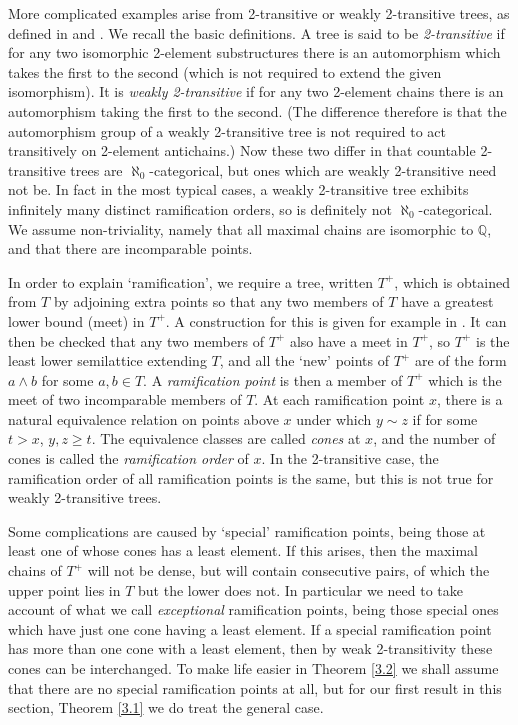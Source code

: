 \documentclass[a4paper,reqno]{amsart}
\numberwithin{equation}{section}
\begin{document}
More complicated examples arise from 2-transitive or weakly 2-transitive trees, as defined in \cite{Droste1} and 
\cite{Droste2}. We recall the basic definitions. A tree is said to be {\em 2-transitive} if for any two 
isomorphic 2-element substructures there is an automorphism which takes the first to the second (which is not
required to extend the given isomorphism). It is {\em weakly 2-transitive} if for any two 2-element chains
there is an automorphism taking the first to the second. (The difference therefore is that the automorphism
group of a weakly 2-transitive tree is not required to act transitively on 2-element antichains.) Now these 
two differ in that countable 2-transitive trees are $\aleph_0$-categorical, but ones which
are weakly 2-transitive need not be. In fact in the most typical cases, a weakly 2-transitive tree exhibits 
infinitely many distinct ramification orders, so is definitely not $\aleph_0$-categorical. We assume non-triviality, 
namely that all maximal chains are isomorphic to $\mathbb Q$, and that there are incomparable points.

In order to explain `ramification', we require a tree, written $T^+$, which is obtained from $T$ by adjoining
extra points so that any two members of $T$ have a greatest lower bound (meet) in $T^+$. A construction for 
this is given for example in \cite{Droste1}. It can then be checked that any two members of $T^+$ also have a 
meet in $T^+$, so $T^+$ is the least lower semilattice extending $T$, and all the `new' points of $T^+$ are of the 
form $a \wedge b$ for some $a, b \in T$. A {\em ramification point} is then a member of $T^+$ which is the meet of two 
incomparable members of $T$. At each ramification point $x$, there is a natural equivalence relation on points
above $x$ under which $y \sim z$ if for some $t > x$, $y, z \ge t$. The equivalence classes are called {\em cones}
at $x$, and the number of cones is called the {\em ramification order} of $x$. In the 2-transitive case, the 
ramification order of all ramification points is the same, but this is not true for weakly 2-transitive trees.

Some complications are caused by `special' ramification points, being those at least one of whose cones has a least
element. If this arises, then the maximal chains of $T^+$ will not be dense, but will contain consecutive pairs, of
which the upper point lies in $T$ but the lower does not. In particular we need to take account of what we call
{\em exceptional} ramification points, being those special ones which have just one cone having a least element. If 
a special ramification point has more than one cone with a least element, then by weak 2-transitivity these cones can
be interchanged. To make life easier in Theorem \ref{3.2} we shall assume that there are no special ramification 
points at all, but for our first result in this section, Theorem \ref{3.1} we do treat the general case.
\end{document}
